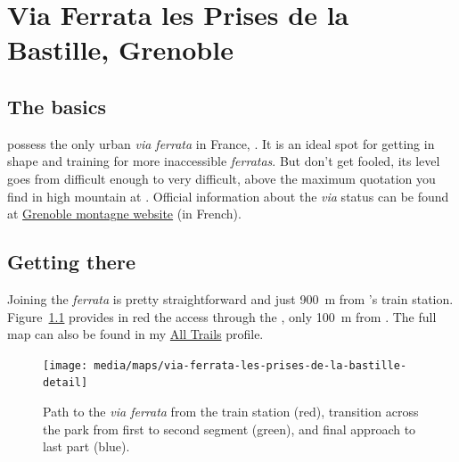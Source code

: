 \chapter{Via Ferrata les Prises de la Bastille, Grenoble}

\section*{The basics}

 possess the only urban \emph{via ferrata} in France, . It is an ideal spot for getting in shape and training for more inaccessible \emph{ferratas}. But don't get fooled, its level goes from difficult enough to very difficult, above the maximum quotation you find in high mountain at . Official information about the \emph{via} status can be found at \href{https://www.grenoble-montagne.com/2268-via-ferrata-de-la-bastille.htm}{Grenoble montagne website} (in French).

\section*{Getting there}

Joining the \emph{ferrata} is pretty straightforward and just 900~m from 's train station. Figure~\ref*{fig:map-via-ferrata-les-prises-de-la-bastille} provides in red the access through the , only 100~m from . The full map can also be found in my \href{https://www.alltrails.com/fr/explore/map/carte-30-decembre-2022-ac9edbb}{All Trails} profile.

\begin{figure}[!ht]
\centering%
\texttt{[image: media/maps/via-ferrata-les-prises-de-la-bastille-detail]}
\caption{\label{fig:map-via-ferrata-les-prises-de-la-bastille}Path to the \emph{via ferrata} from the train station (red), transition across the park from first to second segment (green), and final approach to last part (blue).}
\end{figure}

